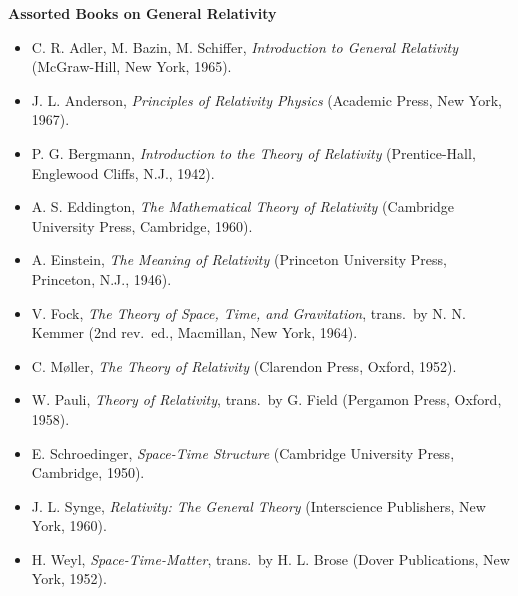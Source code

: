 

\noindent\textbf{Assorted Books on General Relativity}
\begin{itemize}
  \item C. R. Adler, M. Bazin, M. Schiffer,
  \emph{Introduction to General Relativity}
  (McGraw-Hill, New York, 1965).

  \item J. L. Anderson, \emph{Principles of Relativity Physics}
  (Academic Press, New York, 1967).

  \item P. G. Bergmann, \emph{Introduction to the Theory of Relativity}
  (Prentice-Hall, Englewood Cliffs, N.J., 1942).

  \item A. S. Eddington, \emph{The Mathematical Theory of Relativity}
  (Cambridge University Press, Cambridge, 1960).

  \item A. Einstein, \emph{The Meaning of Relativity}
  (Princeton University Press, Princeton, N.J., 1946).

  \item V. Fock, \emph{The Theory of Space, Time, and Gravitation},
  trans.\ by N. N. Kemmer (2nd rev.\ ed., Macmillan, New York, 1964).

  \item C. M\o ller, \emph{The Theory of Relativity}
  (Clarendon Press, Oxford, 1952).

  \item W. Pauli, \emph{Theory of Relativity}, trans.\ by G. Field
  (Pergamon Press, Oxford, 1958).

  \item E. Schroedinger, \emph{Space-Time Structure}
  (Cambridge University Press, Cambridge, 1950).

  \item J. L. Synge, \emph{Relativity: The General Theory}
  (Interscience Publishers, New York, 1960).

  \item H. Weyl, \emph{Space-Time-Matter}, trans.\ by H. L. Brose
  (Dover Publications, New York, 1952).
\end{itemize}

